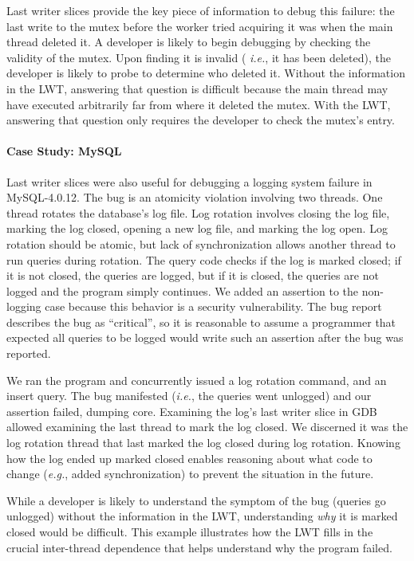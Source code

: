 \documentclass[preprint,9pt]{sigplanconf}
\newcommand{\lwt}{LWT\xspace}
\begin{document}
Last writer slices provide the key piece of information to debug this failure: the last
write to the mutex before the worker tried acquiring it was when the main
thread deleted it.  A developer is likely to begin debugging by checking the
validity of the mutex.  Upon finding it is invalid ({\em
i.e.}, it has been deleted), the developer is likely to probe to determine who 
deleted it.  Without the information in the \lwt, answering that question is difficult
because the main thread may have executed arbitrarily far from where it deleted
the mutex.  With the \lwt, answering that question only requires the developer
to check the mutex's entry.


\paragraph{Case Study: MySQL}
Last writer slices were also useful for debugging a logging system failure in
MySQL-4.0.12.  The bug is an atomicity violation involving two threads.  One
thread rotates the database's log file.  Log rotation involves closing the log
file, marking the log closed, opening a new log file, and marking the log open.
Log rotation should be atomic, but lack of synchronization allows another
thread to run queries during rotation.  The query code checks if the log is
marked closed; if it is not closed, the queries are logged, but if it is
closed, the queries are not logged and the program simply continues.  We added
an assertion to the non-logging case because this behavior is a security
vulnerability.  The bug report describes the bug as ``critical'', so it is
reasonable to assume a programmer that expected all queries to be logged would
write such an assertion after the bug was reported.

We ran the program and concurrently issued a log rotation command, and an
insert query.  The bug manifested ({\em i.e.}, the queries went unlogged) and
our assertion failed, dumping core.  Examining the log's last writer slice in
GDB allowed examining the last thread to mark the log closed.  We discerned it
was the log rotation thread that last marked the log closed during log
rotation.  Knowing how the log ended up marked closed enables reasoning about
what code to change ({\em e.g.}, added synchronization) to prevent the
situation in the future.

While a developer is likely to understand the symptom of the bug (queries go
unlogged) without the information in the \lwt, understanding {\em why} it is marked closed would be
difficult.  This example illustrates how the \lwt fills in the crucial inter-thread
dependence that helps understand why the program failed.
\end{document}
